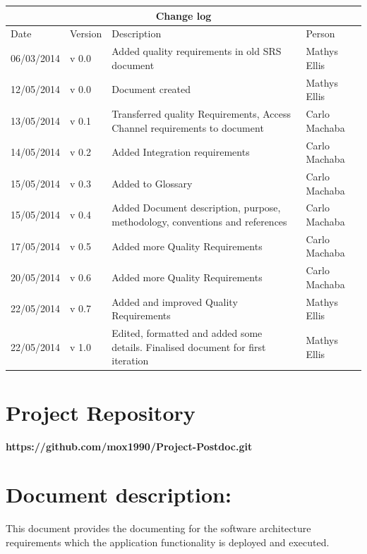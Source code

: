 \documentclass[12pt]{article}
\newcommand{\repo}{https://github.com/mox1990/Project-Postdoc.git}
\begin{document}
\begin{center}
\begin{tabular}{|l|p{1.4cm}|p{8cm}|p{2.8cm}|}
\hline
\multicolumn{4}{|c|}{\bf Change log} \\
\hline
 Date & Version & Description &  Person \\
\hline
06/03/2014 & v 0.0 & Added quality requirements in old SRS document & Mathys Ellis \\
\hline
12/05/2014 & v 0.0 & Document created & Mathys Ellis \\
\hline
13/05/2014 & v 0.1 & Transferred quality Requirements, Access Channel requirements to document & Carlo Machaba \\
\hline
14/05/2014 & v 0.2 & Added Integration requirements & Carlo Machaba\\
\hline
15/05/2014 & v 0.3 & Added to Glossary & Carlo Machaba \\
\hline
15/05/2014 & v 0.4 & Added Document description, purpose, methodology, conventions and references & Carlo Machaba \\
\hline
17/05/2014 & v 0.5 & Added more Quality Requirements & Carlo Machaba \\
\hline
20/05/2014 & v 0.6 & Added more Quality Requirements & Carlo Machaba \\
\hline
22/05/2014 & v 0.7 & Added and improved Quality Requirements & Mathys Ellis \\
\hline
22/05/2014 & v 1.0 & Edited, formatted and added some details. Finalised document for first iteration & Mathys Ellis \\
\hline
\end{tabular}
\end{center}
\newpage
\tableofcontents

\listoffigures
\newpage
\section{Project Repository}
\textbf{\repo}
\newpage
\section{Document description:}
This document provides the documenting for the software architecture requirements which the application functionality is deployed and executed.
\end{document}
